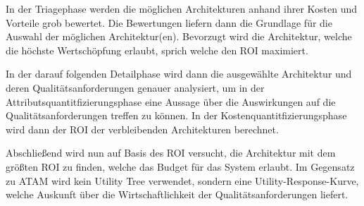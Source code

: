 In der Triagephase werden die möglichen Architekturen anhand ihrer Kosten und Vorteile grob bewertet. Die Bewertungen liefern dann die Grundlage für die Auswahl der möglichen Architektur(en). Bevorzugt wird die Architektur, welche die höchste Wertschöpfung erlaubt, sprich welche den ROI maximiert. \cite[S. 68]{review}

In der darauf folgenden Detailphase wird dann die ausgewählte Architektur und deren Qualitätsanforderungen genauer analysiert, um in der Attributsquantitfizierungsphase eine Aussage über die Auswirkungen auf die Qualitätsanforderungen treffen zu können. In der Kostenquantitfizierungsphase wird dann der ROI der verbleibenden Architekturen berechnet. \cite[S. 68-69]{review}

Abschließend wird nun auf Basis des ROI versucht, die Architektur mit dem größten ROI zu finden, welche das Budget für das System erlaubt. Im Gegensatz zu ATAM wird kein Utility Tree verwendet, sondern eine \glqq Utility-Response-Kurve\grqq, welche Auskunft über die Wirtschaftlichkeit der Qualitätsanforderungen liefert.  \cite[S. 69]{review}
